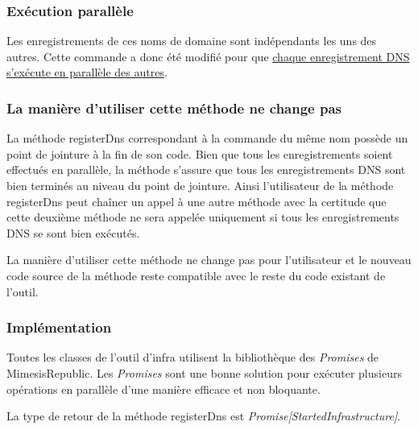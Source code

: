 \subsubsection{Exécution parallèle}

Les enregistrements de ces noms de domaine sont indépendants les uns des autres.
Cette commande a donc été modifié pour que \underline{chaque enregistrement DNS
 s'exécute en parallèle des autres}.

\subsubsection{La manière d'utiliser cette méthode ne change pas}

La méthode registerDns correspondant à la commande du même nom possède un point
de jointure à la fin de son code. Bien que tous les enregistrements soient
effectués en parallèle, la méthode s'assure que tous les enregistrements DNS
sont bien terminés au niveau du point de jointure. 
Ainsi l'utilisateur de la méthode registerDns peut chaîner un appel à une autre
méthode avec la certitude que cette deuxième méthode ne sera appelée uniquement
si tous les enregistrements DNS se sont bien exécutés.

La manière d'utiliser cette méthode ne change pas pour l'utilisateur et le
nouveau code source de la méthode reste compatible avec le reste du code
existant de l'outil.

\subsubsection{Implémentation}

Toutes les classes de l'outil d'infra utilisent la bibliothèque des
\textit{Promises} de MimesisRepublic.
Les \textit{Promises} sont une bonne solution pour exécuter plusieurs opérations
en parallèle d'une manière efficace et non bloquante.

La type de retour de la méthode registerDns est
\textit{Promise[StartedInfrastructure]}.

